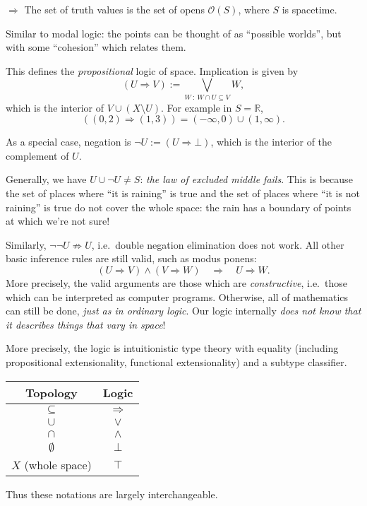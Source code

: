 \documentclass[11pt, oneside, article]{memoir}
\theoremstyle{plain}
\theoremstyle{definition}
\theoremstyle{remark}
\newcommand{\Open}[1]{\mathcal{O}(#1)}
\newcommand{\R}{\mathbb{R}}
\begin{document}
$\Rightarrow$ The set of truth values is the set of opens $\Open{S}$, where $S$ is spacetime. 

Similar to modal logic: the points can be thought of as ``possible worlds'', but with some ``cohesion'' which relates them.

This defines the \emph{propositional} logic of space. Implication is given by
\[
	(U \Rightarrow V) := \bigvee_{W \: : \: W \cap U \subseteq V} W,
\]
which is the interior of $V\cup (X\setminus U)$. For example in $S = \R$,
\[
	((0,2) \Rightarrow (1,3)) = (-\infty, 0) \cup (1,\infty).
\]

As a special case, negation is $\lnot U := (U \Rightarrow \bot)$, which is the interior of the complement of $U$. 

Generally, we have $U \cup \lnot U \neq S$: \emph{the law of excluded middle fails}. This is because the set of places where ``it is raining'' is true and the set of places where ``it is not raining'' is true do not cover the whole space: the rain has a boundary of points at which we're not sure!

Similarly, $\lnot\lnot U \not\Rightarrow U$, i.e.~double negation elimination does not work. All other basic inference rules are still valid, such as modus ponens: 
\[
	(U \Rightarrow V) \land (V\Rightarrow W) \quad \Rightarrow \quad U \Rightarrow W.
\]
More precisely, the valid arguments are those which are \emph{constructive}, i.e.~those which can be interpreted as computer programs. Otherwise, all of mathematics can still be done, \emph{just as in ordinary logic}. Our logic internally \emph{does not know that it describes things that vary in space}!

More precisely, the logic is intuitionistic type theory with equality (including propositional extensionality, functional extensionality) and a subtype classifier.

\begin{center}
\begin{tabular}{cc}
	Topology & Logic \\
	\hline
	 $\subseteq$ & $\Rightarrow$ \\
	 $\cup$ & $\lor$ \\
	 $\cap$ & $\land$ \\
	 $\emptyset$ & $\bot$ \\
	 $X$ (whole space) & $\top$
\end{tabular}
\end{center}

Thus these notations are largely interchangeable.
\end{document}
